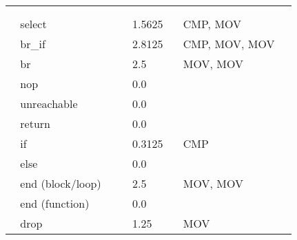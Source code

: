 \documentclass{article}
\begin{document}
\begin{table}
\begin{tabular}{|l|l|l|l|}
\multicolumn{1}{l}{}                        & \multicolumn{1}{l}{}         & \multicolumn{1}{l}{}                                 & \multicolumn{1}{l}{}  \\
\multicolumn{1}{l}{}                        & \multicolumn{1}{l}{}         & \multicolumn{1}{l}{}                                 & \multicolumn{1}{l}{}  \\
\hline
~ select                                    & ~ 1.5625                     & ~ CMP, MOV                                           &                       \\
\hline
~ br\_if                                    & ~ 2.8125                     & ~ CMP, MOV, MOV                                      &                       \\
\hline
~ br                                        & ~ 2.5                        & ~ MOV, MOV                                           &                       \\
\hline
~ nop                                       & ~ 0.0                        &                                                      &                       \\
\hline
~ unreachable~~                             & ~ 0.0                        &                                                      &                       \\
\hline
~ return                                    & ~ 0.0                        &                                                      &                       \\
\hline
~ if                                        & ~ 0.3125                     & ~ CMP                                                &                       \\
\hline
~ else                                      & ~ 0.0                        &                                                      &                       \\
\hline
~ end (block/loop)~~                        & ~ 2.5                        & ~ MOV, MOV                                           &                       \\
\hline
~ end (function)                            & ~ 0.0                        &                                                      &                       \\
\hline
~ drop                                      & ~ 1.25                       & ~ MOV                                                &                       \\

\end{tabular}
\end{table}
\end{document}
